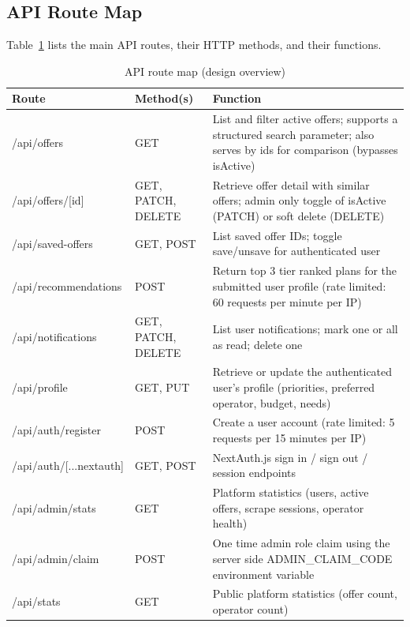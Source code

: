 \subsection{API Route Map}

Table~\ref{tab:api-routes-design} lists the main API routes, their HTTP methods, and their functions.

\begin{table}[H]
  \caption{API route map (design overview)}
  \label{tab:api-routes-design}
  \centering\small
  \begin{tabular}{|p{4.2cm}|p{2.6cm}|p{7.0cm}|}
    \hline
    \textbf{Route} & \textbf{Method(s)} & \textbf{Function} \\
    \hline
    /api/offers              & GET                & List and filter active offers; supports a structured search parameter; also serves by ids for comparison (bypasses isActive) \\
    \hline
    /api/offers/[id]         & GET, PATCH, DELETE & Retrieve offer detail with similar offers; admin only toggle of isActive (PATCH) or soft delete (DELETE) \\
    \hline
    /api/saved-offers        & GET, POST          & List saved offer IDs; toggle save/unsave for authenticated user \\
    \hline
    /api/recommendations     & POST               & Return top 3 tier ranked plans for the submitted user profile (rate limited: 60 requests per minute per IP) \\
    \hline
    /api/notifications       & GET, PATCH, DELETE & List user notifications; mark one or all as read; delete one \\
    \hline
    /api/profile             & GET, PUT           & Retrieve or update the authenticated user's profile (priorities, preferred operator, budget, needs) \\
    \hline
    /api/auth/register       & POST               & Create a user account (rate limited: 5 requests per 15 minutes per IP) \\
    \hline
    /api/auth/[...nextauth] & GET, POST       & NextAuth.js sign in / sign out / session endpoints \\
    \hline
    /api/admin/stats         & GET                & Platform statistics (users, active offers, scrape sessions, operator health) \\
    \hline
    /api/admin/claim         & POST               & One time admin role claim using the server side ADMIN\_CLAIM\_CODE environment variable \\
    \hline
    /api/stats               & GET                & Public platform statistics (offer count, operator count) \\
    \hline
  \end{tabular}
\end{table}

